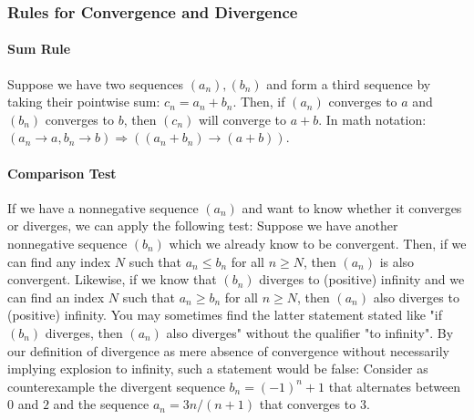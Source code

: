 

\subsubsection{Rules for Convergence and Divergence} 

\paragraph{Sum Rule}
Suppose we have two sequences $(a_n), (b_n)$ and form a third sequence by taking their pointwise sum: $c_n = a_n + b_n$. Then, if $(a_n)$ converges to $a$ and $(b_n)$ converges to $b$, then $(c_n)$ will converge to $a+b$. In math notation: $(a_n \rightarrow a, b_n \rightarrow b) \Rightarrow ((a_n + b_n) \rightarrow (a + b))$.

\paragraph{Comparison Test}
If we have a nonnegative sequence $(a_n)$ and want to know whether it converges or diverges, we can apply the following test: Suppose we have another nonnegative sequence $(b_n)$ which we already know to be convergent. Then, if we can find any index $N$ such that $a_n \leq b_n$ for all $n \geq N$, then $(a_n)$ is also convergent. Likewise, if we know that $(b_n)$ diverges to (positive) infinity and we can find an index $N$ such that $a_n \geq b_n$ for all $n \geq N$, then $(a_n)$ also diverges to (positive) infinity. You may sometimes find the latter statement stated like "if $(b_n)$ diverges, then $(a_n)$ also diverges" without the qualifier "to infinity". By our definition of divergence as mere absence of convergence without necessarily implying explosion to infinity, such a statement would be false: Consider as counterexample the divergent sequence $b_n = (-1)^n + 1$ that alternates between $0$ and $2$ and the sequence $a_n = 3n / (n+1)$ that converges to $3$. 

%
%
% 


